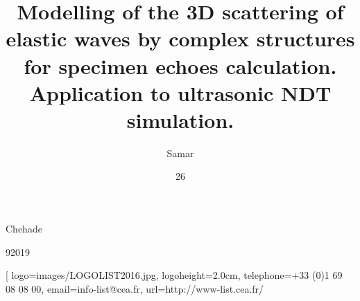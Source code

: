 \author[samar.chehade.sc@gmail.com]{Samar}{Chehade}
%
\title[Modélisation de la diffusion 3D d'ondes élastiques par des structures complexes pour le calcul des échos de géométrie. Application à la simulation des CND par ultrasons.]{Modelling of the 3D scattering of elastic waves by complex structures for specimen echoes calculation. Application to ultrasonic NDT simulation.}
%
%
%
%
\date{26}{9}{2019}
%
%
\subject[Diffraction d'ondes élastiques]{Elastic wave diffraction}
%
%
%
%
%
\laboratory[
logo=images/LOGOLIST2016.jpg,
logoheight=2.0cm,
telephone=+33 (0)1 69 08 08 00,
email=info-list@cea.fr,
url=http://www-list.cea.fr/
